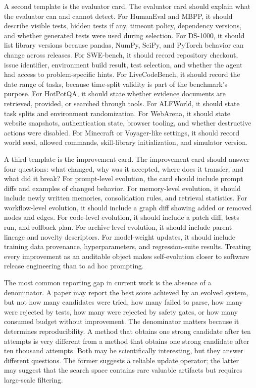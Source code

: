 A second template is the evaluator card. The evaluator card should explain what the evaluator can and cannot detect. For HumanEval and MBPP, it should describe visible tests, hidden tests if any, timeout policy, dependency versions, and whether generated tests were used during selection. For DS-1000, it should list library versions because pandas, NumPy, SciPy, and PyTorch behavior can change across releases. For SWE-bench, it should record repository checkout, issue identifier, environment build result, test selection, and whether the agent had access to problem-specific hints. For LiveCodeBench, it should record the date range of tasks, because time-split validity is part of the benchmark's purpose. For HotPotQA, it should state whether evidence documents are retrieved, provided, or searched through tools. For ALFWorld, it should state task splits and environment randomization. For WebArena, it should state website snapshots, authentication state, browser tooling, and whether destructive actions were disabled. For Minecraft or Voyager-like settings, it should record world seed, allowed commands, skill-library initialization, and simulator version.

A third template is the improvement card. The improvement card should answer four questions: what changed, why was it accepted, where does it transfer, and what did it break? For prompt-level evolution, the card should include prompt diffs and examples of changed behavior. For memory-level evolution, it should include newly written memories, consolidation rules, and retrieval statistics. For workflow-level evolution, it should include a graph diff showing added or removed nodes and edges. For code-level evolution, it should include a patch diff, tests run, and rollback plan. For archive-level evolution, it should include parent lineage and novelty descriptors. For model-weight updates, it should include training data provenance, hyperparameters, and regression-suite results. Treating every improvement as an auditable object makes self-evolution closer to software release engineering than to ad hoc prompting.

The most common reporting gap in current work is the absence of a denominator. A paper may report the best score achieved by an evolved system, but not how many candidates were tried, how many failed to parse, how many were rejected by tests, how many were rejected by safety gates, or how many consumed budget without improvement. The denominator matters because it determines reproducibility. A method that obtains one strong candidate after ten attempts is very different from a method that obtains one strong candidate after ten thousand attempts. Both may be scientifically interesting, but they answer different questions. The former suggests a reliable update operator; the latter may suggest that the search space contains rare valuable artifacts but requires large-scale filtering.

